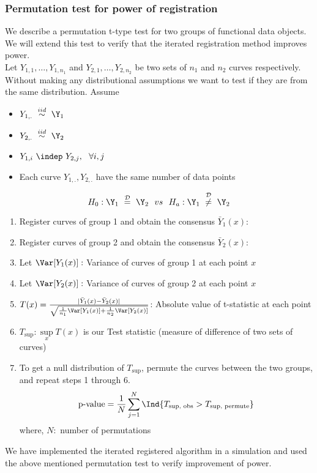 \subsubsection*{Permutation test for power of registration}
We describe a permutation t-type test for two groups of functional data objects. We will extend this test to verify that the iterated registration method improves power. \\
Let $Y_{1,1}, \dots, Y_{1,n_1}$ and $Y_{2,1}, \dots, Y_{2,n_2}$ be two sets of $n_1$ and $n_2$ curves respectively. Without making any distributional assumptions we want to test if they are from the same distribution.
Assume 
\begin{itemize}
\item $Y_{1,.}\  \stackrel{iid}{\sim} \ \Y_1$
\item $Y_{2,.}\  \stackrel{iid}{\sim} \ \Y_2$
\item $Y_{1,i}\  \indep \ Y_{2,j}, \ \ \forall i, j$
\item Each curve $Y_{1,.}, Y_{2,.}$ have the same number of data points
\end{itemize}
\[ H_0: \Y_1 \ \stackrel{\mathcal{D}}{=} \ \Y_2 \ \ vs \ \ H_a: \Y_1 \ \stackrel{\mathcal{D}}{\ne} \ \Y_2 \]
\begin{enumerate}
\item Register curves of group 1 and obtain the consensus $\bar{Y}_1(x): $
\item Register curves of group 2 and obtain the consensus $\bar{Y}_2(x): $
\item Let $\Var[Y_1(x)]: $ Variance of curves of group 1 at each point $x$ 
\item Let $\Var[Y_2(x)]: $ Variance of curves of group 2 at each point $x$ 
\item $T(x) = \frac{|\bar{Y}_1(x) - \bar{Y}_2(x)|}{\sqrt{\frac{1}{n_1}\Var[Y_1(x)] + 
\frac{1}{n_2}\Var[Y_2(x)]}}$: Absolute value of t-statistic at each point
\item $T_{\text{sup}}:  \sup\limits_{x} T(x)$ is our Test statistic (measure of difference of two sets of curves)
\item To get a null distribution of $T_{\text{sup}}$, permute the curves between the two groups, and repeat steps 1 through 6. \\
\[  \text{p-value} = \frac{1}{N}\sum\limits_{j = 1}^{N}\Ind\{T_{\text{sup, obs}} > T_{\text{sup, permute}} \} \]
where, $N:$ number of permutations
\end{enumerate}

We have implemented the iterated registered algorithm in a simulation and used the above mentioned permutation test to verify improvement of power. 
